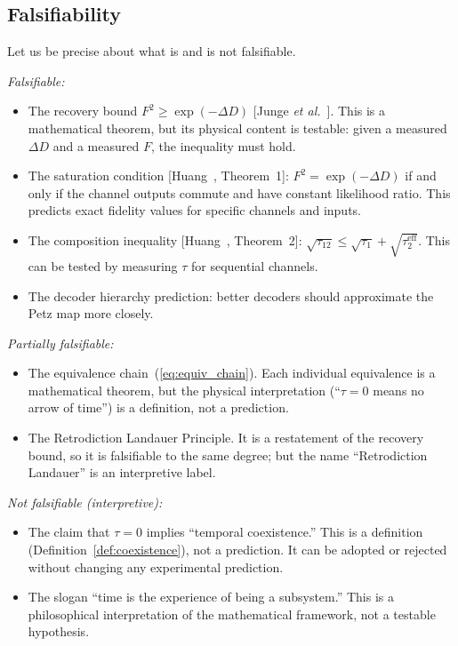 \documentclass[12pt]{article}
\theoremstyle{definition}
\theoremstyle{remark}
\newcommand{\tauasym}{\tau}
\begin{document}
\subsection{Falsifiability}

Let us be precise about what is and is not falsifiable.

\emph{Falsifiable:}
\begin{itemize}
\item The recovery bound $F^2 \geq \exp(-\Delta D)$
[Junge \emph{et al.}~\cite{Junge2018}].  This is a mathematical
theorem, but its physical content is testable: given a measured
$\Delta D$ and a measured $F$, the inequality must hold.
\item The saturation condition
[Huang~\cite{Huang2026}, Theorem~1]:
$F^2 = \exp(-\Delta D)$ if and only if the channel outputs
commute and have constant likelihood ratio.  This predicts exact
fidelity values for specific channels and inputs.
\item The composition inequality
[Huang~\cite{Huang2026}, Theorem~2]:
$\sqrt{\tauasym_{12}} \leq \sqrt{\tauasym_1} +
\sqrt{\tauasym_2^{\text{eff}}}$.  This can be tested by
measuring $\tauasym$ for sequential channels.
\item The decoder hierarchy prediction: better decoders should
approximate the Petz map more closely.
\end{itemize}

\emph{Partially falsifiable:}
\begin{itemize}
\item The equivalence chain~(\ref{eq:equiv_chain}).  Each
individual equivalence is a mathematical theorem, but the
physical interpretation (``$\tauasym = 0$ means no arrow of
time'') is a definition, not a prediction.
\item The Retrodiction Landauer Principle.  It is a restatement
of the recovery bound, so it is falsifiable to the same degree;
but the name ``Retrodiction Landauer'' is an interpretive label.
\end{itemize}

\emph{Not falsifiable (interpretive):}
\begin{itemize}
\item The claim that $\tauasym = 0$ implies ``temporal
coexistence.''  This is a definition
(Definition~\ref{def:coexistence}), not a prediction.  It can be
adopted or rejected without changing any experimental prediction.
\item The slogan ``time is the experience of being a subsystem.''
This is a philosophical interpretation of the mathematical
framework, not a testable hypothesis.
\end{itemize}
\end{document}
